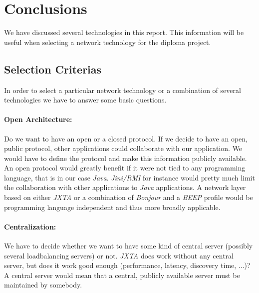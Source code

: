 \section{Conclusions}
We have discussed several technologies in this report. This information will be useful when selecting a network technology for the diploma project. 


\subsection{Selection Criterias}
In order to select a particular network technology or a combination of several technologies we have to answer some basic questions.

\paragraph{Open Architecture:} Do we want to have an open or a closed protocol. If we decide to have an open, public protocol, other applications could collaborate with our application. We would have to define the protocol and make this information publicly available. An open protocol would greatly benefit if it were not tied to any programming language, that is in our case \emph{Java}. \emph{Jini/RMI} for instance would pretty much limit the collaboration with other applications to \emph{Java} applications. A network layer based on either \emph{JXTA} or a combination of \emph{Bonjour} and a \emph{BEEP} profile would be programming language independent and thus more broadly applicable.

\paragraph{Centralization:} We have to decide whether we want to have some kind of central server (possibly several loadbalancing servers) or not. \emph{JXTA} does work without any central server, but does it work good enough (performance, latency, discovery time, ...)? A central server would mean that a central, publicly available server must be maintained by somebody. 
